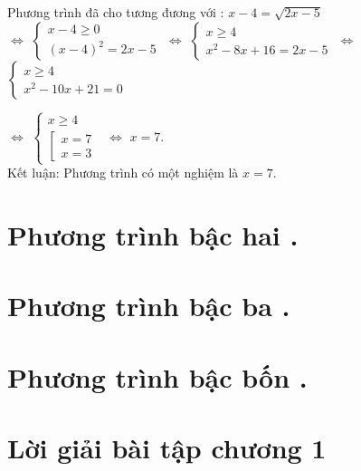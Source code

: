          Phương trình đã cho tương đương với : $ x - 4 = \sqrt{2x-5} $ \\
         $ \Leftrightarrow $
         $
            \begin{cases}
                x - 4 \geq 0 \\
                (x-4)^2 = 2x -5
            \end{cases}
         $
         $ \Leftrightarrow $
         $
            \begin{cases}
                x  \geq 4 \\
                x^2 -8x + 16 = 2x -5
            \end{cases}
         $
         $ \Leftrightarrow $
         $
            \begin{cases}
                x  \geq 4 \\
                x^2 -10x + 21 = 0
              \end{cases}
         $

         $ \Leftrightarrow $
         $
            \begin{cases}
                x  \geq 4 \\
                \left[
                  \begin{array} {l}
                     x = 7 \\ x=3
                  \end{array}
                \right.
              \end{cases}
         $
         $ \Leftrightarrow $
         $
              x =7.
         $
\\         Kết luận: Phương trình có một nghiệm là $ x=7 $.
\section{Phương trình bậc hai  .}



\section{Phương trình bậc ba .}

\section{Phương trình bậc bốn .}
\section*{Lời giải bài tập chương 1}
{\small}
